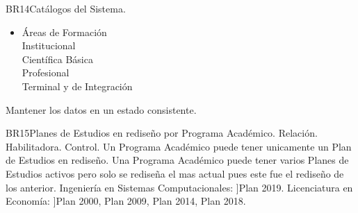 \begin{BussinesRule}{BR14}{Catálogos del Sistema.}
\begin{itemize}
            Escuela Superior de Cómputo (ESCOM) \\
            Unidad Profesional Interdisciplinaria de Ingeniería y Ciencias Sociales y Administrativas ( UPIICSA) \\
            Unidad Profesional Interdisciplinaria en Ingeniería y Tecnologías Avanzadas (UPIITA) \\
            Unidad Profesional Interdisciplinaria de Biotecnología (UPIBI) \\
            Unidad Profesional Interdisciplinaria de Ingeniería, Campus Guanajuato (UPIIG) \\
            Unidad Profesional Interdisciplinaria de Ingeniería, Campus Zacatecas (UPIIZ) \\
            Escuela Nacional de Ciencias Biológicas (ENCB) \\
            Escuela Superior de Medicina (ESM) \\
            Escuela Nacional de Medicina y Homeopatía (ENMH) \\
            Escuela Superior de Enfermería y Obstetricia (ESEO) \\
            Centro Interdisciplinario de Ciencias de la Salud (CICS) Unidad Milpa Alta \\
            Centro Interdisciplinario de Ciencias de la Salud (CICS) Unidad Santo Tomás \\
            Escuela Superior de Comercio y Administración (ESCA) Unidad Santo Tomás \\
            Escuela Superior de Comercio y Administración (ESCA) Unidad Tepepan \\
            Escuela Superior de Economía (ESE) \\
            Escuela Superior de Turismo (EST) \\
            Centro de Lenguas Extranjeras
        \item Áreas de Formación\\
            Institucional\\
            Científica Básica\\
            Profesional\\
            Terminal y de Integración
    \end{itemize}
    \BRitem[Motivación: ]Mantener los datos en un estado consistente.
\end{BussinesRule}
\begin{BussinesRule}{BR15}{Planes de Estudios en rediseño por Programa Académico.}
    \BRitem[Tipo:] Relación.
    \BRitem[Clase:] Habilitadora.
    \BRitem[Nivel:] Control.
    \BRitem[Descripción:] Un Programa Académico puede tener unicamente un Plan de Estudios en rediseño.
    \BRitem[Motivación: ]Una Programa Académico puede tener varios Planes de Estudios activos pero solo se rediseña el mas actual pues este fue el rediseño de los anterior.
     Ingeniería en Sistemas Computacionales: ]Plan 2019.
     Licenciatura en Economía: ]Plan 2000, Plan 2009, Plan 2014, Plan 2018.
\end{BussinesRule}

